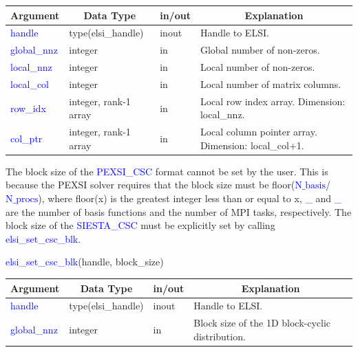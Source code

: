 \documentclass{report}
\begin{document}
\begin{tabular}[]{|p{30mm}|p{35mm}|p{15mm}|p{85mm}|}
\hline
\multicolumn{1}{|c|}{\textbf{Argument}} & \multicolumn{1}{c|}{\textbf{Data Type}} & \multicolumn{1}{c|}{\textbf{in/out}} & \multicolumn{1}{c|}{\textbf{Explanation}}\\
\hline
\textcolor{blue}{handle}      & type(elsi\_handle)    & inout & Handle to ELSI.\\
\hline
\textcolor{blue}{global\_nnz} & integer               & in    & Global number of non-zeros.\\
\hline
\textcolor{blue}{local\_nnz}  & integer               & in    & Local number of non-zeros.\\
\hline
\textcolor{blue}{local\_col}  & integer               & in    & Local number of matrix columns.\\
\hline
\textcolor{blue}{row\_idx}    & integer, rank-1 array & in    & Local row index array. Dimension: local\_nnz.\\
\hline
\textcolor{blue}{col\_ptr}    & integer, rank-1 array & in    & Local column pointer array. Dimension: local\_col+1.\\
\hline
\end{tabular}

The block size of the \textcolor{blue}{PEXSI\_CSC} format cannot be set by the user. This is because the PEXSI solver requires that the block size must be floor(\textcolor{blue}{$\text{N}\_\text{basis}$}/\textcolor{blue}{$\text{N}\_\text{procs}$}), where floor(x) is the greatest integer less than or equal to x, \textcolor{blue}{\_} and \textcolor{blue}{\_} are the number of basis functions and the number of MPI tasks, respectively. The block size of the \textcolor{blue}{SIESTA\_CSC} must be explicitly set by calling \textcolor{blue}{elsi\_set\_csc\_blk}.

\newpage
\begin{labeling}{\hspace{6cm}}
\item [\hspace{0.3cm} \textcolor{blue}{elsi\_set\_csc\_blk}(handle, block\_size)]
\end{labeling}

\begin{tabular}[]{|p{30mm}|p{30mm}|p{15mm}|p{90mm}|}
\hline
\multicolumn{1}{|c|}{\textbf{Argument}} & \multicolumn{1}{c|}{\textbf{Data Type}} & \multicolumn{1}{c|}{\textbf{in/out}} & \multicolumn{1}{c|}{\textbf{Explanation}}\\
\hline
\textcolor{blue}{handle}       & type(elsi\_handle) & inout & Handle to ELSI.\\
\hline
\textcolor{blue}{global\_nnz}  & integer            & in    & Block size of the 1D block-cyclic distribution.\\
\hline
\end{tabular}
\end{document}
